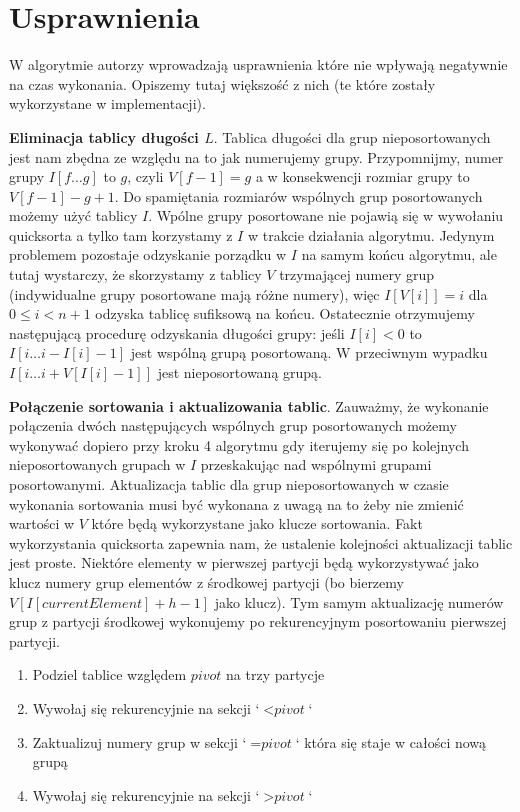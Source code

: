 \documentclass[12pt]{article}
\begin{document}
\section*{Usprawnienia}

W algorytmie autorzy wprowadzają usprawnienia które nie wpływają negatywnie na czas wykonania. Opiszemy tutaj większość z nich (te które zostały wykorzystane w implementacji).

\textbf{Eliminacja tablicy długości $L$}. Tablica długości dla grup nieposortowanych jest nam zbędna ze względu na to jak numerujemy grupy. Przypomnijmy, numer grupy $I[f \ldots g]$ to $g$, czyli $V[f-1] = g$ a w konsekwencji rozmiar grupy to $V[f-1] - g + 1$. Do spamiętania rozmiarów wspólnych grup posortowanych możemy użyć tablicy $I$. Wpólne grupy posortowane nie pojawią się w wywołaniu quicksorta a tylko tam korzystamy z $I$ w trakcie działania algorytmu. Jedynym problemem pozostaje odzyskanie porządku w $I$ na samym końcu algorytmu, ale tutaj wystarczy, że skorzystamy z tablicy $V$ trzymającej numery grup (indywidualne grupy posortowane mają różne numery), więc $I[V[i]] = i$ dla $0 \leq i < n+1$ odzyska tablicę sufiksową na końcu. Ostatecznie otrzymujemy następującą procedurę odzyskania długości grupy: jeśli $I[i] < 0$ to $I[i \ldots i - I[i] - 1]$ jest wspólną grupą posortowaną. W przeciwnym wypadku $I[i \ldots i + V[I[i]-1]]$ jest nieposortowaną grupą. 

\textbf{Połączenie sortowania i aktualizowania tablic}. Zauważmy, że wykonanie połączenia dwóch następujących wspólnych grup posortowanych możemy wykonywać dopiero przy kroku 4 algorytmu gdy iterujemy się po kolejnych nieposortowanych grupach w $I$ przeskakując nad wspólnymi grupami posortowanymi. Aktualizacja tablic dla grup nieposortowanych w czasie wykonania sortowania musi być wykonana z uwagą na to żeby nie zmienić wartości w $V$ które będą wykorzystane jako klucze sortowania. Fakt wykorzystania quicksorta zapewnia nam, że ustalenie kolejności aktualizacji tablic jest proste. Niektóre elementy w pierwszej partycji będą wykorzystywać jako klucz numery grup elementów z środkowej partycji (bo bierzemy $V[I[currentElement] + h - 1]$ jako klucz). Tym samym aktualizację numerów grup z partycji środkowej wykonujemy po rekurencyjnym posortowaniu pierwszej partycji.
\begin{enumerate}
    \item Podziel tablice względem $pivot$ na trzy partycje
    \item Wywołaj się rekurencyjnie na sekcji `$< \textit{pivot}$`
    \item Zaktualizuj numery grup w sekcji `$= \textit{pivot}$` która się staje w całości nową grupą
    \item Wywołaj się rekurencyjnie na sekcji `$> \textit{pivot}$`
\end{enumerate}
\medskip

\printbibliography[title={Bibliografia}]
\end{document}
